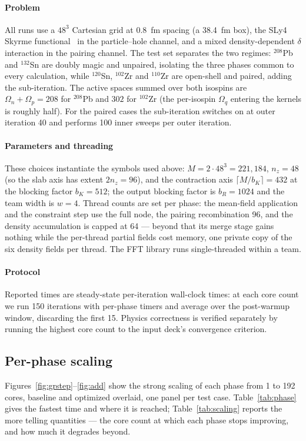 \documentclass[preprint,12pt]{elsarticle}
\numberwithin{equation}{section}
\begin{document}
\paragraph{Problem}
All runs use a $48^3$ Cartesian grid at 0.8~fm spacing (a 38.4~fm box), the SLy4 Skyrme functional~\cite{chabanat1998} in the particle--hole channel, and a mixed density-dependent $\delta$ interaction in the pairing channel. The test set separates the two regimes: $^{208}$Pb and $^{132}$Sn are doubly magic and unpaired, isolating the three phases common to every calculation, while $^{120}$Sn, $^{102}$Zr and $^{110}$Zr are open-shell and paired, adding the sub-iteration. The active spaces summed over both isospins are $\Omega_n+\Omega_p=208$ for $^{208}$Pb and $302$ for $^{102}$Zr (the per-isospin $\Omega_q$ entering the kernels is roughly half). For the paired cases the sub-iteration switches on at outer iteration 40 and performs 100 inner sweeps per outer iteration.

\paragraph{Parameters and threading}
These choices instantiate the symbols used above: $M=2\cdot48^3=221{,}184$, $n_z=48$ (so the slab axis has extent $2n_z=96$), and the contraction axis $\lceil M/b_K\rceil=432$ at the blocking factor $b_K=512$; the output blocking factor is $b_R=1024$ and the team width is $w=4$. Thread counts are set per phase: the mean-field application and the constraint step use the full node, the pairing recombination 96, and the density accumulation is capped at 64 --- beyond that its merge stage gains nothing while the per-thread partial fields cost memory, one private copy of the six density fields per thread. The FFT library runs single-threaded within a team.

\paragraph{Protocol}
Reported times are steady-state per-iteration wall-clock times: at each core count we run 150 iterations with per-phase timers and average over the post-warmup window, discarding the first 15. Physics correctness is verified separately by running the highest core count to the input deck's convergence criterion.

\subsection{Per-phase scaling}\label{sec:perphase}
Figures~\ref{fig:grstep}--\ref{fig:add} show the strong scaling of each phase from 1 to 192 cores, baseline and optimized overlaid, one panel per test case. Table~\ref{tab:phase} gives the fastest time and where it is reached; Table~\ref{tab:scaling} reports the more telling quantities --- the core count at which each phase stops improving, and how much it degrades beyond.
\end{document}
